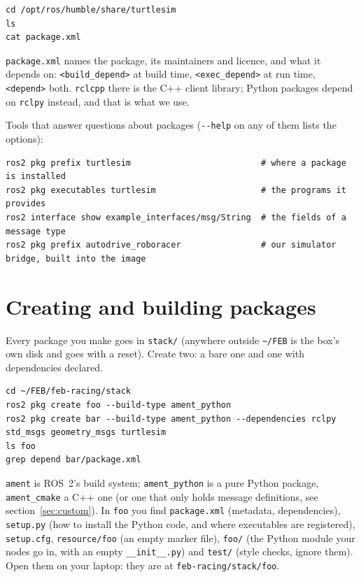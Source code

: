 \documentclass[11pt,a4paper]{article}
\begin{document}
\begin{lstlisting}
cd /opt/ros/humble/share/turtlesim
ls
cat package.xml
\end{lstlisting}

\texttt{package.xml} names the package, its maintainers and licence, and what it depends on:
\texttt{<build\_depend>} at build time, \texttt{<exec\_depend>} at run time,
\texttt{<depend>} both. \texttt{rclcpp} there is the C++ client library; Python packages depend on \texttt{rclpy}
instead, and that is what we use.

Tools that answer questions about packages (\texttt{-{}-help} on any of them lists the options):

\begin{lstlisting}
ros2 pkg prefix turtlesim                          # where a package is installed
ros2 pkg executables turtlesim                     # the programs it provides
ros2 interface show example_interfaces/msg/String  # the fields of a message type
ros2 pkg prefix autodrive_roboracer                # our simulator bridge, built into the image
\end{lstlisting}

\section{Creating and building packages}

Every package you make goes in \texttt{stack/} (anywhere outside \texttt{\textasciitilde/FEB} is
the box's own disk and goes with a reset). Create two: a bare one and one with dependencies declared.

\begin{lstlisting}
cd ~/FEB/feb-racing/stack
ros2 pkg create foo --build-type ament_python
ros2 pkg create bar --build-type ament_python --dependencies rclpy std_msgs geometry_msgs turtlesim
ls foo
grep depend bar/package.xml
\end{lstlisting}

\texttt{ament} is ROS~2's build system; \texttt{ament\_python} is a pure Python package,
\texttt{ament\_cmake} a C++ one (or one that only holds message definitions, see
section~\ref{sec:custom}). In \texttt{foo} you find \texttt{package.xml} (metadata,
dependencies), \texttt{setup.py} (how to install the Python code, and where executables are
registered), \texttt{setup.cfg}, \texttt{resource/foo} (an empty marker file), \texttt{foo/} (the
Python module your nodes go in, with an empty \texttt{\_\_init\_\_.py}) and \texttt{test/} (style
checks, ignore them). Open them on your laptop: they are at
\texttt{feb-racing/stack/foo}.
\end{document}
